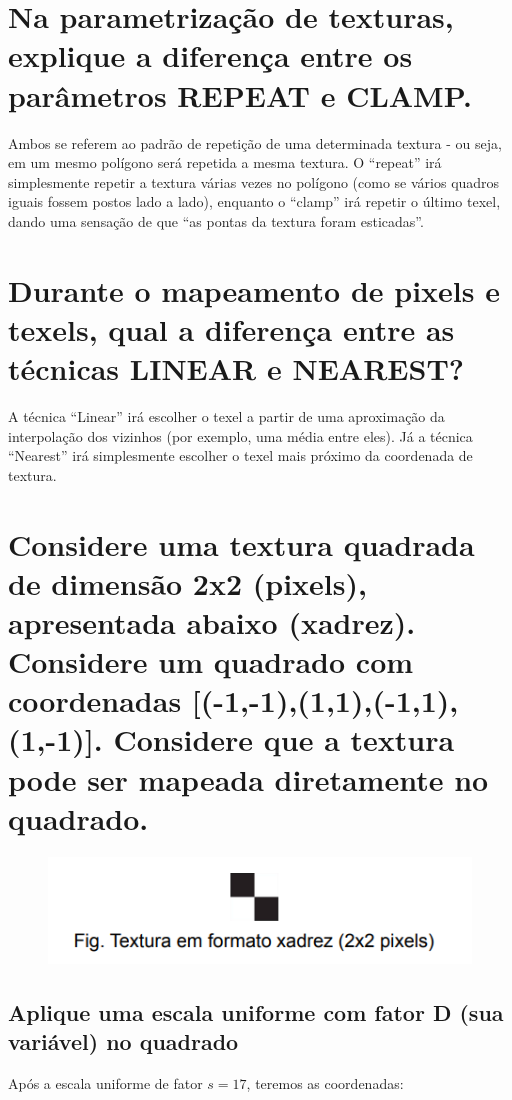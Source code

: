 \documentclass{article}
\begin{document}
\section{Na parametrização de texturas, explique a diferença entre os parâmetros REPEAT e CLAMP.}

Ambos se referem ao padrão de repetição de uma determinada textura - ou seja, em um mesmo polígono será repetida a mesma textura. O ``repeat'' irá simplesmente repetir a textura várias vezes no polígono (como se vários quadros iguais fossem postos lado a lado), enquanto o ``clamp'' irá repetir o último texel, dando uma sensação de que ``as pontas da textura foram esticadas''.

\section{Durante o mapeamento de pixels e texels, qual a diferença entre as técnicas LINEAR e NEAREST?}

A técnica ``Linear'' irá escolher o texel a partir de uma aproximação da interpolação dos vizinhos (por exemplo, uma média entre eles). Já a técnica ``Nearest'' irá simplesmente escolher o texel mais próximo da coordenada de textura.

\section{Considere uma textura quadrada de dimensão 2x2 (pixels), apresentada abaixo (xadrez). Considere um quadrado com coordenadas [(-1,-1),(1,1),(-1,1),(1,-1)]. Considere que a textura pode ser mapeada diretamente no quadrado.}

\begin{figure}[h!]
\centering
\includegraphics[scale=0.5]{img/xadrez.png}
\end{figure}

\subsection{Aplique uma escala uniforme com fator D (sua variável) no quadrado}

Após a escala uniforme de fator $s = 17$, teremos as coordenadas:
\end{document}
